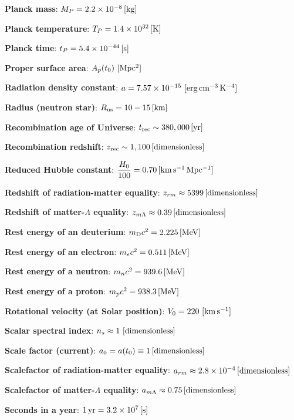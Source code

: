 \documentclass[a4paper,10pt]{article}
\begin{document}
{\noindent}\textbf{Planck mass}: $M_P = 2.2\times10^{-8}\,[{\rm kg}]$

{\noindent}\textbf{Planck temperature}: $T_P = 1.4\times10^{32}\,[{\rm K}]$

{\noindent}\textbf{Planck time}: $t_P = 5.4\times10^{-44}\,[{\rm s}]$

{\noindent}\textbf{Proper surface area}: $A_p(t_0) ~ [{\rm Mpc^2}]$

{\noindent}\textbf{Radiation density constant}: $a=7.57\times10^{-15} ~ [{\rm erg\,cm^{-3}\,K^{-4}}]$

{\noindent}\textbf{Radius (neutron star)}: $R_{\rm ns} = 10-15\,[{\rm km}]$

{\noindent}\textbf{Recombination age of Universe}: $t_\mathrm{rec} \sim 380,000\,[{\rm yr}]$

{\noindent}\textbf{Recombination redshift}: $z_\mathrm{rec}\sim1,100\,[{\rm dimensionless}]$

{\noindent}\textbf{Reduced Hubble constant}: $\dfrac{H_0}{100} = 0.70\,[{\rm km\,s^{-1}\,Mpc^{-1}}]$

{\noindent}\textbf{Redshift of radiation-matter equality}: $z_{rm} \approx 5399\,[{\rm dimensionless}]$

{\noindent}\textbf{Redshift of matter-$\Lambda$ equality}: $z_{m\Lambda}
\approx0.39\,[{\rm dimensionless}]$

{\noindent}\textbf{Rest energy of an deuterium}: $m_\mathrm{D}c^2 = 2.225\,[{\rm MeV}]$

{\noindent}\textbf{Rest energy of an electron}: $m_ec^2 = 0.511\,[{\rm MeV}]$

{\noindent}\textbf{Rest energy of a neutron}: $m_nc^2 = 939.6\,[{\rm MeV}]$

{\noindent}\textbf{Rest energy of a proton}: $m_pc^2 = 938.3\,[{\rm MeV}]$

{\noindent}\textbf{Rotational velocity (at Solar position)}: $V_0 = 220 ~ [{\rm km\,s^{-1}}]$

{\noindent}\textbf{Scalar spectral index}: $n_s\approx1 ~ [{\rm dimensionless}]$

{\noindent}\textbf{Scale factor (current)}: $a_0=a(t_0)\equiv1\,[{\rm dimensionless}]$

{\noindent}\textbf{Scalefactor of radiation-matter equality}: $a_{rm} \approx 2.8\times10^{-4}\,[{\rm dimensionless}]$

{\noindent}\textbf{Scalefactor of matter-$\Lambda$ equality}: $a_{m\Lambda}
\approx0.75\,[{\rm dimensionless}]$

{\noindent}\textbf{Seconds in a year}: $1\,{\rm yr} = 3.2\times10^7\,[{\rm s}]$
\end{document}
